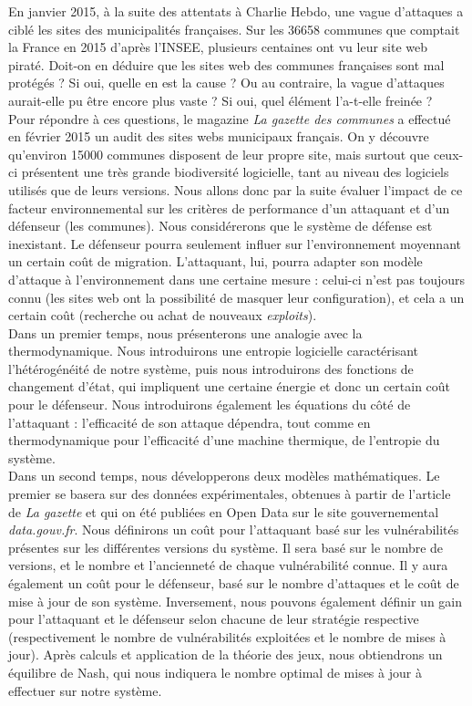 En janvier 2015, à la suite des attentats à Charlie Hebdo, une vague d'attaques a ciblé les sites des municipalités françaises\cite{courrier}.
Sur les 36658 communes que comptait la France en 2015 d'après l'INSEE\cite{communes_INSEE}, plusieurs centaines ont vu leur site web piraté.
Doit-on en déduire que les sites web des communes françaises sont mal protégés ? Si oui, quelle en est la cause ?
Ou au contraire, la vague d'attaques aurait-elle pu être encore plus vaste ? Si oui, quel élément l'a-t-elle freinée ?\\
Pour répondre à ces questions, le magazine \textit{La gazette des communes} a effectué en février 2015 un audit des sites webs municipaux français\cite{gazette}. On y découvre qu'environ 15000 communes disposent de leur propre site, mais surtout que ceux-ci présentent une très grande biodiversité logicielle, tant au niveau des logiciels utilisés que de leurs versions.
Nous allons donc par la suite évaluer l'impact de ce facteur environnemental sur les critères de performance d'un attaquant et d'un défenseur (les communes). Nous considérerons que le système de défense est inexistant. Le défenseur pourra seulement influer sur l'environnement moyennant un certain coût de migration. L'attaquant, lui, pourra adapter son modèle d'attaque à l'environnement dans une certaine mesure : celui-ci n'est pas toujours connu (les sites web ont la possibilité de masquer leur configuration), et cela a un certain coût (recherche ou achat de nouveaux \textit{exploits}).\\
Dans un premier temps, nous présenterons une analogie avec la thermodynamique. Nous introduirons une entropie logicielle caractérisant l’hétérogénéité de notre système, puis nous introduirons des fonctions de changement d'état, qui impliquent une certaine énergie et donc un certain coût pour le défenseur. Nous introduirons également les équations du côté de l'attaquant : l'efficacité de son attaque dépendra, tout comme en thermodynamique pour l'efficacité d'une machine thermique, de l'entropie du système.\\
Dans un second temps, nous développerons deux modèles mathématiques. Le premier se basera sur des données expérimentales, obtenues à partir de l'article de \textit{La gazette} et qui on été publiées en Open Data sur le site gouvernemental \textit{data.gouv.fr}\cite{data.gouv}. Nous définirons un coût pour l'attaquant basé sur les vulnérabilités présentes sur les différentes versions du système. Il sera basé sur le nombre de versions, et le nombre et l'ancienneté de chaque vulnérabilité connue. Il y aura également un coût pour le défenseur, basé sur le nombre d'attaques et le coût de mise à jour de son système. Inversement, nous pouvons également définir un gain pour l'attaquant et le défenseur selon chacune de leur stratégie respective (respectivement le nombre de vulnérabilités exploitées et le nombre de mises à jour). Après calculs et application de la théorie des jeux, nous obtiendrons un équilibre de Nash, qui nous indiquera le nombre optimal de mises à jour à effectuer sur notre système.\\
